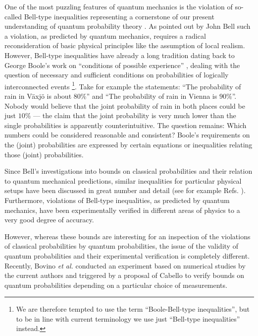 \documentclass[pra,amsmath,amsfonts,showkeys,showpacs,preprint]{revtex4}
\begin{document}
One of the most puzzling features of quantum mechanics is the
violation of so-called Bell-type inequalities representing a
cornerstone of our present understanding of quantum probability theory
\cite{peres93}. As pointed out by John Bell \cite{bell64} such a
violation, as predicted by quantum mechanics, requires a radical reconsideration of basic physical
principles like the assumption of local realism. However, Bell-type inequalities have already a long tradition
dating back to George Boole's work on ``conditions of possible
experience'' \cite{boole54, boole62}, dealing with the question of
necessary and sufficient conditions on probabilities of logically
interconnected events \footnote{We are therefore tempted to
  use the term ``Boole-Bell-type inequalities'', but to be in line
  with current terminology we use just ``Bell-type inequalities'' instead.}.
Take for example the statements: ``The probability of rain in V\"axj\"o
is about $80\%$'' and ``The probability
of rain in Vienna is $90\%$''. Nobody would
believe  that the joint probability of rain in both places could be
just $10\%$ --- the claim that the joint probability is very much lower than the single
probabilities is apparently counterintuitive. The question remains:
Which numbers could be considered reasonable and consistent?
Boole's requirements on the (joint) probabilities
are expressed by certain equations or inequalities relating those (joint) probabilities.

Since Bell's investigations \cite{bell64,bell66} into bounds on classical
probabilities and their relation to quantum mechanical predictions,
similar inequalities for particular physical setups have been
discussed in great number and detail (see for example Refs.
\cite{clauser69,clauser74,werner-wolf01,zukowskibrukner02}).
Furthermore, violations of Bell-type
inequalities,
as predicted by quantum mechanics,
have been experimentally verified in different areas of physics
\cite{aspect82, weihs98, rowe01, hasegawa03} to a very good degree of accuracy.

However, whereas these bounds are interesting for an inspection of
the violations of classical probabilities by quantum probabilities,
the issue of the validity of quantum probabilities and their
experimental verification is completely different. Recently, Bovino
\emph{et al.} \cite{bovino04} conducted an experiment based on
numerical studies by the current authors \cite{filipp-svozil04} and
triggered by a proposal of Cabello \cite{cabello04} to verify bounds on
quantum probabilities depending on a particular choice of
measurements.
\end{document}
